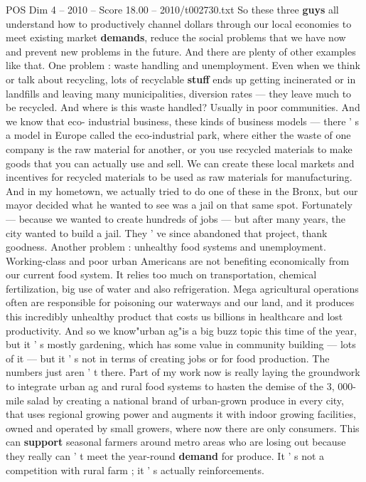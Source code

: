 \begin{textsample}{POS Dim 4 – 2010 – Score 18.00 – 2010/t002730.txt}
So these three \textbf{guys} all understand how to productively channel dollars through our local economies to meet existing market \textbf{demands}, reduce the social problems that we have now and prevent new problems in the future.
And there are plenty of other examples like that.
One problem : waste handling and unemployment.
Even when we think or talk about recycling, lots of recyclable \textbf{stuff} ends up getting incinerated or in landfills and leaving many municipalities, diversion rates — they leave much to be recycled.
And where is this waste handled?
Usually in poor communities.
And we know that eco- industrial business, these kinds of business models — there ' s a model in Europe called the eco-industrial park, where either the waste of one company is the raw material for another, or you use recycled materials to make goods that you can actually use and sell.
We can create these local markets and incentives for recycled materials to be used as raw materials for manufacturing.
And in my hometown, we actually tried to do one of these in the Bronx, but our mayor decided what he wanted to see was a jail on that same spot.
Fortunately — because we wanted to create hundreds of jobs — but after many years, the city wanted to build a jail.
They ' ve since abandoned that project, thank goodness.
Another problem : unhealthy food systems and unemployment.
Working-class and poor urban Americans are not benefiting economically from our current food system.
It relies too much on transportation, chemical fertilization, big use of water and also refrigeration.
Mega agricultural operations often are responsible for poisoning our waterways and our land, and it produces this incredibly unhealthy product that costs us billions in healthcare and lost productivity.
And so we know"urban ag"is a big buzz topic this time of the year, but it ' s mostly gardening, which has some value in community building — lots of it — but it ' s not in terms of creating jobs or for food production.
The numbers just aren ' t there.
Part of my work now is really laying the groundwork to integrate urban ag and rural food systems to hasten the demise of the 3, 000-mile salad by creating a national brand of urban-grown produce in every city, that uses regional growing power and augments it with indoor growing facilities, owned and operated by small growers, where now there are only consumers.
This can \textbf{support} seasonal farmers around metro areas who are losing out because they really can ' t meet the year-round \textbf{demand} for produce.
It ' s not a competition with rural farm ; it ' s actually reinforcements.

\end{textsample}
